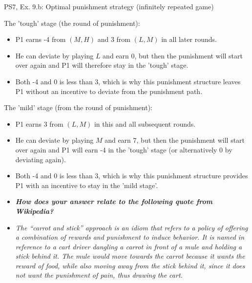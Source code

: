 \begin{frame}{PS7, Ex. 9.b: Optimal punishment strategy (infinitely repeated game)}
    \begin{multicols}{2}
      The 'tough' stage (the  round of punishment):\vspace{-4pt}
      \begin{itemize}
        \item P1 earns -4 from $(M, H)$ and 3 from $(L, M)$ in all later rounds.
        \item He can deviate by playing $L$ and earn 0, but then the punishment will start over again and P1 will therefore stay in the 'tough' stage.
        \item Both -4 and 0 is less than 3, which is why this punishment structure leaves P1 without an incentive to deviate from the punishment path.
      \end{itemize}
      \vfill\null\columnbreak
      The 'mild' stage (from the  round of punishment):\vspace{-4pt}
      \begin{itemize}
        \item P1 earns 3 from $(L, M)$ in this and all subsequent rounds.
        \item He can deviate by playing $M$ and earn 7, but then the punishment will start over again and P1 will earn -4 in the 'tough' stage (or alternatively 0 by deviating again).
        \item Both -4 and 0 is less than 3, which is why this punishment structure provides P1 with an incentive to stay in the 'mild stage'.
      \end{itemize}
      \vfill\null
    \end{multicols}
    \vspace{-24pt}
    \begin{itemize}
      \item[(b)] \textbf{\textit{How does your answer relate to the following quote from Wikipedia?}}
      \item[] \textit{The “carrot and stick” approach is an idiom that refers to a policy of offering a combination of rewards and punishment to induce behavior. It is named in reference to a cart driver dangling a carrot in front of a mule and holding a stick behind it. The mule would move towards the carrot because it wants the reward of food, while also moving away from the stick behind it, since it does not want the punishment of pain, thus drawing the cart.}
    \end{itemize}
\end{frame}
